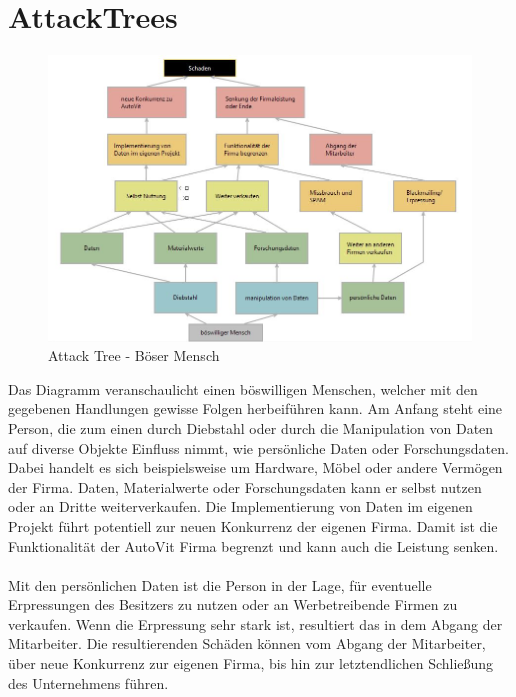 \section{AttackTrees}

\begin{figure}[h]
\includegraphics[scale=0.8, angle=90]{images/attacktree_boesermensch.jpg} 
\caption{Attack Tree - Böser Mensch}
\end{figure}

Das Diagramm veranschaulicht einen böswilligen Menschen, welcher mit den gegebenen Handlungen gewisse Folgen herbeiführen kann. Am Anfang steht eine Person, die zum einen durch Diebstahl oder durch die Manipulation von Daten auf diverse Objekte Einfluss nimmt, wie persönliche Daten oder Forschungsdaten. Dabei handelt es sich beispielsweise um Hardware, Möbel oder andere Vermögen der Firma. Daten, Materialwerte oder Forschungsdaten kann er selbst nutzen oder an Dritte weiterverkaufen. Die Implementierung von Daten im eigenen Projekt führt potentiell zur neuen Konkurrenz der eigenen Firma. Damit ist die Funktionalität der AutoVit Firma begrenzt und kann auch die Leistung senken.
\\
\\
Mit den persönlichen Daten ist die Person in der Lage, für eventuelle Erpressungen des Besitzers zu nutzen oder an Werbetreibende Firmen zu verkaufen. Wenn die Erpressung sehr stark ist, resultiert das in dem Abgang der Mitarbeiter. Die resultierenden Schäden können vom Abgang der Mitarbeiter, über neue Konkurrenz zur eigenen Firma, bis hin zur letztendlichen Schließung des Unternehmens führen.
